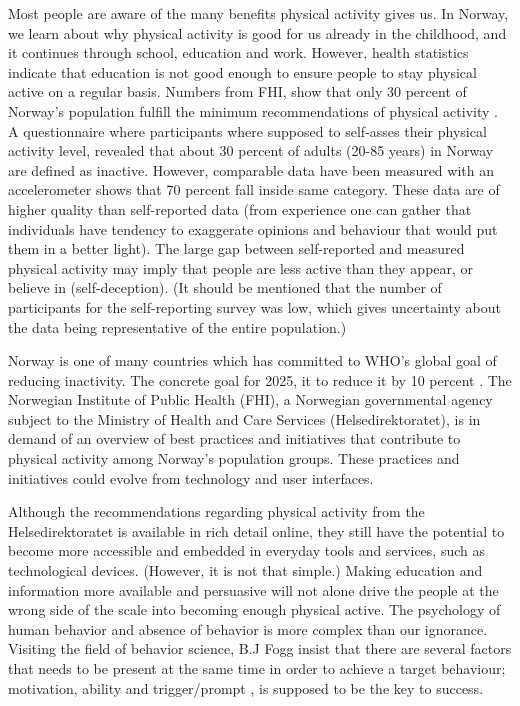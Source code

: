 Most people are aware of the many benefits physical activity gives us. In Norway, we learn about why physical activity is good for us already in the childhood, and it continues through school, education and work. However, health statistics indicate that education is not good enough to ensure people to stay physical active on a regular basis. Numbers from FHI, show that only 30 percent of Norway's population fulfill the minimum recommendations of physical activity \cite{folkehelseinstituttet_fysisk_nodate}. %
A questionnaire where participants where supposed to self-asses their physical activity level, revealed that about 30 percent of adults (20-85 years) in Norway are defined as inactive. However, comparable data have been measured with an accelerometer shows that 70 percent fall inside same category. These data are of higher quality than self-reported data (from experience one can gather that individuals have tendency to exaggerate opinions and behaviour that would put them in a better light). The large gap between self-reported and measured physical activity may imply that people are less active than they appear, or believe in (self-deception). (It should be mentioned that the number of participants for the self-reporting survey was low, which gives uncertainty about the data being representative of the entire population.) 

Norway is one of many countries which has committed to WHO's global goal of reducing inactivity. The concrete goal for 2025, it to reduce it by 10 percent \cite{noauthor_inaktivitet_nodate}.
The Norwegian Institute of Public Health (FHI), a Norwegian governmental agency subject to the Ministry of Health and Care Services (Helsedirektoratet), is in demand of an overview of best practices and initiatives that contribute to physical activity among Norway's population groups. These practices and initiatives could evolve from technology and user interfaces.

Although the recommendations regarding physical activity from the Helsedirektoratet is available in rich detail online, they still have the potential to become more accessible and embedded in everyday tools and services, such as technological devices. (However, it is not that simple.) Making education and information more available and persuasive will not alone drive the people at the wrong side of the scale into becoming enough physical active. The psychology of human behavior and absence of behavior is more complex than our ignorance. Visiting the field of behavior science, B.J Fogg insist that there are several factors that needs to be present at the same time in order to achieve a target behaviour; motivation, ability and trigger/prompt \cite{fogg_persuasive_2003}, is supposed to be the key to success. 

